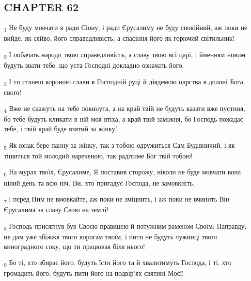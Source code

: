 \subsection{CHAPTER 62}
\begin{tcolorbox}
\textsubscript{1} Не буду мовчати я ради Сіону, і ради Єрусалиму не буду спокійний, аж поки не вийде, як сяйво, його справедливість, а спасіння його як горючий світильник!
\end{tcolorbox}
\begin{tcolorbox}
\textsubscript{2} І побачать народи твою справедливість, а славу твою всі царі, і йменням новим будуть звати тебе, що уста Господні докладно означать його.
\end{tcolorbox}
\begin{tcolorbox}
\textsubscript{3} І ти станеш короною слави в Господній руці й діядемою царства в долоні Бога свого!
\end{tcolorbox}
\begin{tcolorbox}
\textsubscript{4} Вже не скажуть на тебе покинута, а на край твій не будуть казати вже пустиня, бо тебе будуть кликати в ній моя втіха, а край твій заміжня, бо Господь пожадає тебе, і твій край буде взятий за жінку!
\end{tcolorbox}
\begin{tcolorbox}
\textsubscript{5} Як юнак бере панну за жінку, так з тобою одружиться Сам Будівничий, і як тішиться той молодий нареченою, так радітиме Бог твій тобою!
\end{tcolorbox}
\begin{tcolorbox}
\textsubscript{6} На мурах твоїх, Єрусалиме, Я поставив сторожу, ніколи не буде мовчати вона цілий день та всю ніч. Ви, хто пригадує Господа, не замовкніть,
\end{tcolorbox}
\begin{tcolorbox}
\textsubscript{7} і перед Ним не вмовкайте, аж поки не зміцнить, і аж поки не вчинить Він Єрусалима за славу Свою на землі!
\end{tcolorbox}
\begin{tcolorbox}
\textsubscript{8} Господь присягнув був Своєю правицею й потужним раменом Своїм: Направду, не дам уже збіжжя твого ворогам твоїм, і пити не будуть чужинці твого виноградного соку, що ти працював біля нього!
\end{tcolorbox}
\begin{tcolorbox}
\textsubscript{9} Бо ті, хто збирає його, будуть їсти його та й хвалитимуть Господа, і ті, хто громадить його, будуть пити його на подвір'ях святині Моєї!
\end{tcolorbox}
